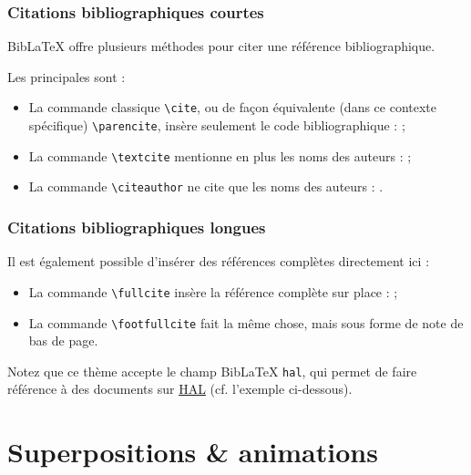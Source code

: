 \documentclass[10pt,    %
    french,             %
    xcolor=table,       %
    envcountsect,       %
    aspectratio=43      %
]{beamer}
\begin{document}
\begin{frame}
    \frametitle{Citations bibliographiques courtes} 
    
    BibLaTeX offre plusieurs méthodes pour citer une référence bibliographique. 
    
    Les principales sont :
    \begin{itemize}
        \item La commande classique \texttt{\textbackslash{}cite}, ou de façon équivalente (dans ce contexte spécifique) \texttt{\textbackslash{}parencite}, insère seulement le code bibliographique : \cite{Cossu2016} ;
        \item La commande \texttt{\textbackslash{}textcite} mentionne en plus les noms des auteurs : \textcite{Cossu2016} ;
        \item La commande \texttt{\textbackslash{}citeauthor} ne cite que les noms des auteurs : \citeauthor{Cossu2016}.
    \end{itemize}
\end{frame}

\begin{frame}
    \frametitle{Citations bibliographiques longues} 
    
    Il est également possible d'insérer des références complètes directement ici :
    \begin{itemize}
        \item La commande \texttt{\textbackslash{}fullcite} insère la référence complète sur place :  ;
        \item La commande \texttt{\textbackslash{}footfullcite} fait la même chose, mais sous forme de note de bas de page.
    \end{itemize}
    
    Notez que ce thème accepte le champ BibLaTeX \texttt{hal}, qui permet de faire référence à des documents sur \href{https://hal.archives-ouvertes.fr/}{HAL} (cf. l'exemple ci-dessous).
\end{frame}










\section{Superpositions \& animations}
\label{sec:animations}
\sectionframe
\end{document}
